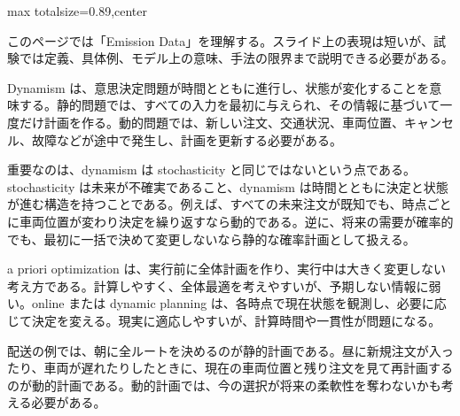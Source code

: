 \begin{minipage}[t]{0.58\textwidth}
\begin{adjustbox}{max totalsize={\textwidth}{0.89\textheight},center}
\begin{minipage}{\textwidth}\scriptsize
{}このページでは「Emission Data」を理解する。スライド上の表現は短いが、試験では定義、具体例、モデル上の意味、手法の限界まで説明できる必要がある。\par
Dynamism は、意思決定問題が時間とともに進行し、状態が変化することを意味する。静的問題では、すべての入力を最初に与えられ、その情報に基づいて一度だけ計画を作る。動的問題では、新しい注文、交通状況、車両位置、キャンセル、故障などが途中で発生し、計画を更新する必要がある。\par
重要なのは、dynamism は stochasticity と同じではないという点である。stochasticity は未来が不確実であること、dynamism は時間とともに決定と状態が進む構造を持つことである。例えば、すべての未来注文が既知でも、時点ごとに車両位置が変わり決定を繰り返すなら動的である。逆に、将来の需要が確率的でも、最初に一括で決めて変更しないなら静的な確率計画として扱える。\par
a priori optimization は、実行前に全体計画を作り、実行中は大きく変更しない考え方である。計算しやすく、全体最適を考えやすいが、予期しない情報に弱い。online または dynamic planning は、各時点で現在状態を観測し、必要に応じて決定を変える。現実に適応しやすいが、計算時間や一貫性が問題になる。\par
配送の例では、朝に全ルートを決めるのが静的計画である。昼に新規注文が入ったり、車両が遅れたりしたときに、現在の車両位置と残り注文を見て再計画するのが動的計画である。動的計画では、今の選択が将来の柔軟性を奪わないかも考える必要がある。\par

\end{minipage}
\end{adjustbox}
\end{minipage}
